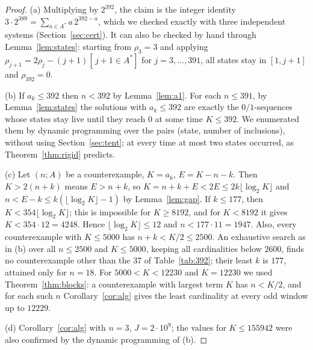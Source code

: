 \documentclass[11pt]{amsart}
\theoremstyle{definition}
\theoremstyle{remark}
\begin{document}
\begin{proof}
(a) Multiplying by $2^{392}$, the claim is the integer identity $3\cdot2^{389}=\sum_{a\in A^*}a\,2^{392-a}$, which we checked exactly with three independent systems (Section~\ref{sec:cert}). It can also be checked by hand through Lemma~\ref{lem:states}: starting from $\rho_3=3$ and applying $\rho_{j+1}=2\rho_j-(j+1)[\,j+1\in A^*]$ for $j=3,\dots,391$, all states stay in $[1,j+1]$ and $\rho_{392}=0$.

(b) If $a_k\le392$ then $n<392$ by Lemma~\ref{lem:a1}. For each $n\le391$, by Lemma~\ref{lem:states} the solutions with $a_k\le392$ are exactly the $0/1$-sequences whose states stay live until they reach $0$ at some time $K\le392$. We enumerated them by dynamic programming over the pairs (state, number of inclusions), without using Section~\ref{sec:tent}; at every time at most two states occurred, as Theorem~\ref{thm:rigid} predicts.

(c) Let $(n;A)$ be a counterexample, $K=a_k$, $E=K-n-k$. Then $K>2(n+k)$ means $E>n+k$, so $K=n+k+E<2E\le 2k\lfloor\log_2K\rfloor$ and $n<E-k\le k(\lfloor\log_2K\rfloor-1)$ by Lemma~\ref{lem:gap}. If $k\le177$, then $K<354\lfloor\log_2K\rfloor$; this is impossible for $K\ge8192$, and for $K<8192$ it gives $K<354\cdot12=4248$. Hence $\lfloor\log_2 K\rfloor\le12$ and $n<177\cdot11=1947$. Also, every counterexample with $K\le5000$ has $n+k<K/2\le2500$. An exhaustive search as in (b) over all $n\le2500$ and $K\le5000$, keeping all cardinalities below $2600$, finds no counterexample other than the $37$ of Table~\ref{tab:392}; their least $k$ is $177$, attained only for $n=18$. For $5000<K<12230$ and $K=12230$ we used Theorem~\ref{thm:blocks}: a counterexample with largest term $K$ has $n<K/2$, and for each such $n$ Corollary~\ref{cor:alg} gives the least cardinality at every odd window up to $12229$.

(d) Corollary~\ref{cor:alg} with $n=3$, $J=2\cdot10^9$; the values for $K\le155942$ were also confirmed by the dynamic programming of (b).


\end{proof}
\end{document}
